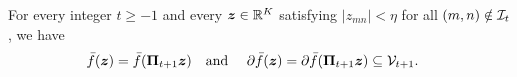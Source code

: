\begin{proposition}
\label{newrand:robust}
For every integer $t\ge-1$ and every $\bm{z}\in{\mathbb{R}}^K$
satisfying $|z_{mn}|<\eta$ for all $(m,n)\notin {\cal I}_t$, 
we have
\begin{equation}
\label{newrand:robust-identity}
\begin{aligned}
 \bar f(\bm{z})&=\bar f(\mathbf{\Pi}_{t+1}\bm{z}) \quad \text{and } \quad  
 \partial \bar f(\bm{z}) =\partial \bar f(\mathbf{\Pi}_{t+1}\bm{z})
 \subseteq {\cal V}_{t+1}.
\end{aligned}
\end{equation}
\end{proposition}
